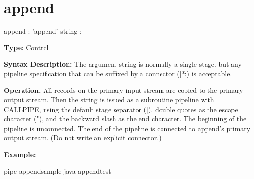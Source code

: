 \section{append}
\begin{shaded}
\begin{rail}
  append : 'append' string
  ;
\end{rail}
\end{shaded}

\textbf{Type:} Control

\textbf{Syntax Description:} The argument string is normally a single stage, but any pipeline
specification that can be suffixed by a connector (|*:) is acceptable.

\textbf{Operation:} All records on the primary input stream are copied
to the primary output stream. Then the string is issued as a
subroutine pipeline with CALLPIPE, using the default stage separator
(|), double quotes as the escape character ("), and the backward slash
as the end character. The beginning of the pipeline is
unconnected. The end of the pipeline is connected to append’s primary
output stream. (Do not write an explicit connector.)

\textbf{Example:}

 
\bash[stdout]
pipc appendsample
\END
\bash[stdout]
java appendtest
\END


